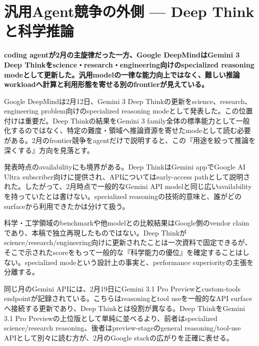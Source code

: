 \section{汎用Agent競争の外側 — Deep Thinkと科学推論}
\noindent\textbf{coding agentが2月の主旋律だった一方、Google DeepMindはGemini 3 Deep Thinkをscience・research・engineering向けのspecialized reasoning modeとして更新した。汎用modelの一律な能力向上ではなく、難しい推論workloadへ計算と利用形態を寄せる別のfrontierが見えている。}\autocite{src-dd5d9b8662f3}

Google DeepMindは2月12日、Gemini 3 Deep Thinkの更新をscience、research、engineering problem向けのspecialized reasoning modeとして発表した。この位置付けは重要だ。Deep Thinkの結果をGemini 3 family全体の標準能力として一般化するのではなく、特定の難度・領域へ推論資源を寄せたmodeとして読む必要がある。2月のfrontier競争をagentだけで説明すると、この『用途を絞って推論を深くする』方向を見落とす。\autocite{src-dd5d9b8662f3}


\begin{claimboundary}
発表時点のavailabilityにも境界がある。Deep ThinkはGemini appでGoogle AI Ultra subscriber向けに提供され、APIについてはearly-access pathとして説明された。したがって、2月時点で一般的なGemini API modelと同じ広いavailabilityを持っていたとは書けない。specialized reasoningの技術的意味と、誰がどのsurfaceから利用できたかは分けて扱う。\autocite{src-dd5d9b8662f3}
\end{claimboundary}

\begin{claimboundary}
科学・工学領域のbenchmarkや他modelとの比較結果はGoogle側のvendor claimであり、本稿で独立再現したものではない。Deep Thinkがscience/research/engineering向けに更新されたことは一次資料で固定できるが、そこで示されたscoreをもって一般的な『科学能力の優位』を確定することはしない。specialized modeという設計上の事実と、performance superiorityの主張を分離する。\autocite{src-dd5d9b8662f3}
\end{claimboundary}

同じ月のGemini APIには、2月19日にGemini 3.1 Pro Previewとcustom-tools endpointが記録されている。こちらはreasoningとtool useを一般的なAPI surfaceへ接続する更新であり、Deep Thinkとは役割が異なる。Deep ThinkをGemini 3.1 Pro Previewの上位版として単純に並べるより、前者はspecialized science/research reasoning、後者はpreview-stageのgeneral reasoning/tool-use APIとして別々に読む方が、2月のGoogle stackの広がりを正確に表せる。\autocite{src-a24fd97eb3d0}


